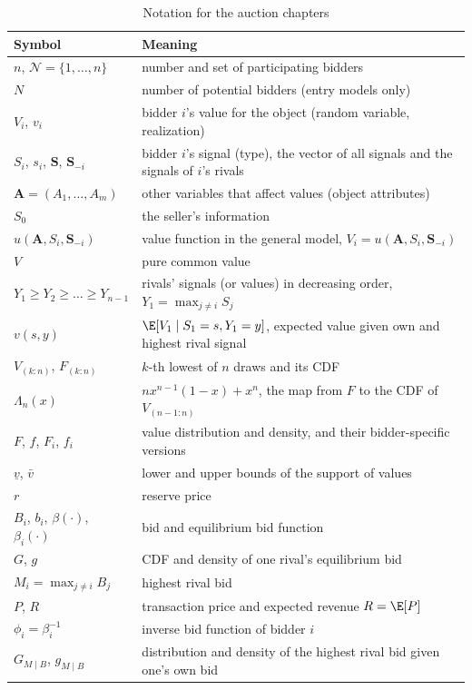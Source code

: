 \begin{table}[htbp]
\centering
\caption{Notation for the auction chapters}\label{tab:14-notation}
\small
\begin{tabularx}{\textwidth}{@{}p{3.6cm}X@{}}
\toprule
Symbol & Meaning \\
\midrule
$n$, $\mathcal{N}=\{1,\dots,n\}$ & number and set of participating bidders \\
$N$ & number of potential bidders (entry models only) \\
$V_i$, $v_i$ & bidder $i$'s value for the object (random variable, realization) \\
$S_i$, $s_i$, $\bm S$, $\bm S_{-i}$ & bidder $i$'s signal (type), the vector of all signals and the signals of $i$'s rivals \\
$\bm A=(A_1,\dots,A_m)$ & other variables that affect values (object attributes) \\
$S_0$ & the seller's information \\
$u(\bm A,S_i,\bm S_{-i})$ & value function in the general model, $V_i=u(\bm A,S_i,\bm S_{-i})$ \\
$V$ & pure common value \\
$Y_1\ge Y_2\ge\dots\ge Y_{n-1}$ & rivals' signals (or values) in decreasing order, $Y_1=\max_{j\neq i}S_j$ \\
$v(s,y)$ & $\E[V_1\mid S_1=s,Y_1=y]$, expected value given own and highest rival signal \\
$V_{(k:n)}$, $F_{(k:n)}$ & $k$-th lowest of $n$ draws and its CDF \\
$\Lambda_n(x)$ & $nx^{n-1}(1-x)+x^n$, the map from $F$ to the CDF of $V_{(n-1:n)}$ \\
$F$, $f$, $F_i$, $f_i$ & value distribution and density, and their bidder-specific versions \\
$\underline v$, $\bar v$ & lower and upper bounds of the support of values \\
$r$ & reserve price \\
$B_i$, $b_i$, $\beta(\cdot)$, $\beta_i(\cdot)$ & bid and equilibrium bid function \\
$G$, $g$ & CDF and density of one rival's equilibrium bid \\
$M_i=\max_{j\neq i}B_j$ & highest rival bid \\
$P$, $R$ & transaction price and expected revenue $R=\E[P]$ \\
$\phi_i=\beta_i^{-1}$ & inverse bid function of bidder $i$ \\
$G_{M\mid B}$, $g_{M\mid B}$ & distribution and density of the highest rival bid given one's own bid \\

\end{tabularx}
\end{table}
